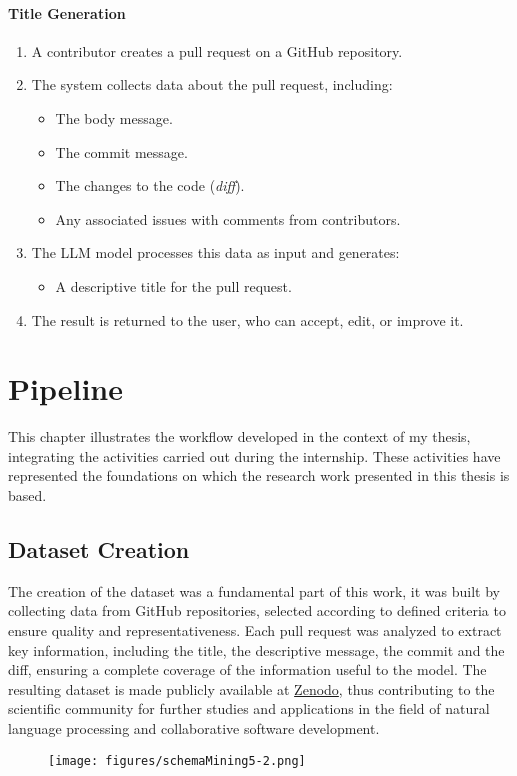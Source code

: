 \begin{itemize}
\subsubsection{Title Generation}
\begin{enumerate}
\item A contributor creates a pull request on a GitHub repository.
\item The system collects data about the pull request, including:
\begin{itemize}
\item The body message.
\item The commit message.
\item The changes to the code (\textit{diff}).
\item Any associated issues with comments from contributors.
\end{itemize}
\item The LLM model processes this data as input and generates:
\begin{itemize}
\item A descriptive title for the pull request.
\end{itemize}
\item The result is returned to the user, who can accept, edit, or improve it.
\end{enumerate}
\end{itemize}
\chapter{Pipeline}
This chapter illustrates the workflow developed in the context of my thesis, integrating the activities carried out during the internship. These activities have represented the foundations on which the research work presented in this thesis is based.
\section{Dataset Creation}
The creation of the dataset was a fundamental part of this work, it was built by collecting data from GitHub repositories, selected according to defined criteria to ensure quality and representativeness. Each pull request was analyzed to extract key information, including the title, the descriptive message, the commit and the diff, ensuring a complete coverage of the information useful to the model.
The resulting dataset is made publicly available at \href{https://zenodo.org/records/14546914?token=eyJhbGciOiJIUzUxMiJ9.eyJpZCI6IjBhODI4NDk5LTdlODItNDZhZS1iZDgwLWEwNDUwMWQyOTg3YSIsImRhdGEiOnt9LCJyYW5kb20iOiIzZTFjYTBmMjkxMGRkNmVkYTY5M2Y2ZDFlODAyYTdmYyJ9.IiQkMkHUAq2AzlhwHkaLyXBMDycStf--_gtWm1ZCQadw9IFWeaJakTNiXLE4PNPnm-cPYi63f1vPUfEy-lyo_Q}{Zenodo}, thus contributing to the scientific community for further studies and applications in the field of natural language processing and collaborative software development.
\begin{figure}[H] 
    \centering
        \texttt{[image: figures/schemaMining5-2.png]}
\end{figure}
